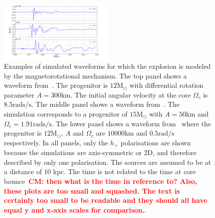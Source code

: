 \documentclass[aps,twocolumn,showpacs,groupedaddress, nofootinbib]{revtex4}  %
\newcommand{\cm}[1]{\textbf{\textcolor{red}{CM: #1}}}
\begin{document}

%
%
\begin{figure}
\includegraphics[width=0.5\textwidth]{mag_waveforms.png}
\caption{Examples of simulated waveforms for which the explosion is modeled by
the magnetorotational mechanism. The top panel shows a waveform
from~\cite{abdikamalov2014measuring}. The progenitor is $12\text{M}_\odot$ with
differential rotation parameter $A=300\text{km}$. The initial angular velocity
at the core $\Omega_c$ is $8.5\text{rads/s}$. The middle panel shows a waveform
from~\cite{dimmelmeier2008gravitational}. The simulation corresponds to a
progenitor of $15\text{M}_\odot$ with $A=50$km and $\Omega_c =
1.91\text{rads/s}$.  The lower panel shows a waveform
from~\cite{richers2017equation} where the progenitor is $12\text{M}_\odot$, $A$
and $\Omega_c$ are $10000$km and $0.5\text{rad/s}$ respectively. In all panels,
only the $h_{+}$ polarisations are shown because the simulations are
axis-symmetric or 2D, and therefore described by only one polarisation.  The
sources are assumed to be at a distance of $10$ kpc. The time is not related to
the time at core bounce~\cm{then what is the time in reference to? Also, these
plots are too small and squashed. The text is certainly too small to be
readable and they should all have equal y and x-axis scales for comparison.}.
\label{fig:magwaveforms}} 
\end{figure}
\end{document}

